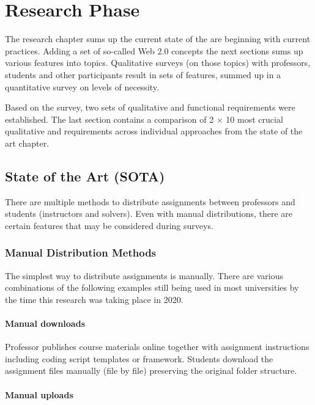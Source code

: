 \chapter{Research Phase} \label{chap:research}

{The research chapter sums up the current state of the are beginning with current practices. Adding a set of so-called Web 2.0 concepts the next sections sums up various features into topics. Qualitative surveys (on those topics) with professors, students and other participants result in sets of features, summed up in a quantitative survey on levels of necessity.}

{Based on the survey, two sets of qualitative and functional requirements were established. The last section contains a comparison of 2 × 10 most crucial qualitative and requirements across individual approaches from the state of the art chapter.}

\section{State of the Art (SOTA)} \label{sec:sota}

{There are multiple methods to distribute assignments between professors and students (instructors and solvers). Even with manual distributions, there are certain features that may be considered during surveys.}

\subsection{Manual Distribution Methods} \label{ssec:manual}

{The simplest way to distribute assignments is manually. There are various combinations of the following examples still being used in most universities by the time this research was taking place in 2020.}

\subsubsection{Manual downloads}

{Professor publishes course materials online together with assignment instructions including coding script templates or framework. Students download the assignment files manually (file by file) preserving the original folder structure.}

\subsubsection{Manual uploads}

